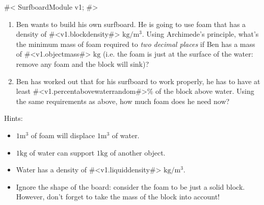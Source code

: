 





\providecommand{\surfboardtemplatecommands}{defined}
\providecommand{\kg}{\ensuremath{\text{kg}}}
\providecommand{\metre}{\ensuremath{\text{m}}}
\providecommand{\volume}{\ensuremath{\metre^3}}
\providecommand{\density}{\ensuremath{\kg/\volume}}

#<
SurfboardModule v1;
#>


\begin{enumerate}

\item Ben wants to build his own surfboard.  He is going to use foam
  that has a density of #<v1.blockdensity#> \density.  Using
  Archimede's principle, what's the minimum mass of foam required to
  \emph{two decimal places} if Ben has a mass of #<v1.objectmass#>
  \kg{} (i.e. the foam is just at the surface of the water: remove any
  foam and the block will sink)?

\item Ben has worked out that for his surfboard to work properly, he
  has to have at least #<v1.percentabovewaterrandom#>\% of the block
  above water.  Using the same requirements as above, how much foam
  does he need now?

\end{enumerate}

Hints: 
\begin{itemize}
\item $1 \volume$ of foam will displace $1 \volume$ of water.
\item $1 \kg$ of water can support $1 \kg$ of another object.
\item Water has a density of #<v1.liquiddensity#> \density.
\item Ignore the shape of the board: consider the foam to be just a
  solid block.  However, don't forget to take the mass of the block
  into account!
\end{itemize}

